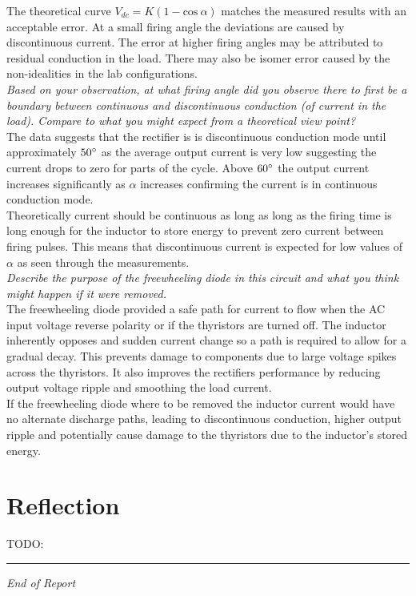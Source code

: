 \documentclass[12pt,a4paper]{article}
\begin{document}
The theoretical curve $V_{dc}=K(1-\mathrm{cos}\:\alpha)$ matches the measured results with an acceptable error. At a small firing angle the deviations are caused by discontinuous current. The error at higher firing angles may be attributed to residual conduction in the load. There may also be isomer error caused by the non-idealities in the lab configurations.\\

\textit{Based on your observation, at what firing angle did you observe there to first be a boundary between continuous and discontinuous conduction (of current in the load). Compare to what you might expect from a theoretical view point?}\\

The data suggests that the rectifier is is discontinuous conduction mode until approximately $50\degree$ as the average output current is very low suggesting the current drops to zero for parts of the cycle. Above $60\degree$ the output current increases significantly as $\alpha$ increases confirming the current is in continuous conduction mode.\\
Theoretically current should be continuous as long as long as the firing time is long enough for the inductor to store energy to prevent zero current between firing pulses. This means that discontinuous current is expected for low values of $\alpha$ as seen through the measurements.\\

\textit{Describe the purpose of the freewheeling diode in this circuit and what you think might happen if it were removed.}\\

The freewheeling diode provided a safe path for current to flow when the AC input voltage reverse polarity or if the thyristors are turned off. The inductor inherently opposes and sudden current change so a path is required to allow for a gradual decay. This prevents damage to components due to large voltage spikes across the thyristors. It also improves the rectifiers performance by reducing output voltage ripple and smoothing the load current.\\
If the freewheeling diode where to be removed the inductor current would have no alternate discharge paths, leading to discontinuous conduction, higher output ripple and potentially cause damage to the thyristors due to the inductor's stored energy.

\section{Reflection}

TODO: 

\vfill
\hrule
\begin{center}
\textit{End of Report}
\end{center}
\end{document}
